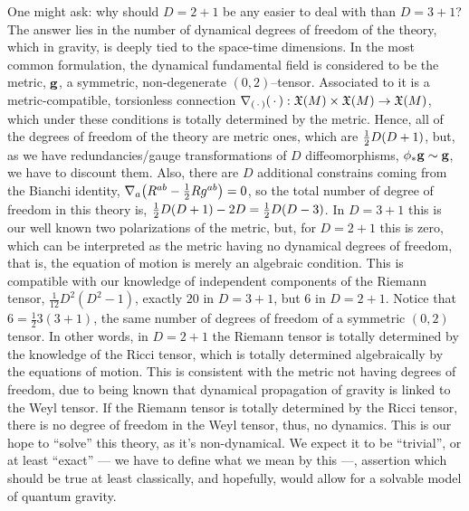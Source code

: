 One might ask: why should $D=2+1$ be any easier to deal with than $D=3+1$? The answer lies in the number of dynamical degrees of freedom of the theory, which in gravity, 
is deeply tied to the space-time dimensions. In the most common formulation, the dynamical fundamental field is considered to be the metric, $\vb g$, 
a symmetric, non-degenerate $(0,2)$--tensor. Associated to it is a metric-compatible, torsionless connection $\nabla_{\qty(\,\cdot\,)}\qty(\,\cdot\,):\mathfrak X\qty(M)\times \mathfrak X\qty(M)\rightarrow\mathfrak X(M)$, 
which under these conditions is totally determined by the metric. Hence, all of the degrees of freedom of the theory are metric ones, which are $\frac12D\qty(D+1)$, but, as we have redundancies/gauge 
transformations of $D$ diffeomorphisms, $\phi_\ast\vb g\sim\vb g$, we have to discount them. Also, there are $D$ additional constrains coming from the Bianchi identity, $\nabla_a\qty(R^{ab}-\frac12 Rg^{ab})=0$, 
so the total number of degree of freedom in this theory is, $\frac12D\qty(D+1)-2D=\frac12D\qty(D-3)$. 
In $D=3+1$ this is our well known two polarizations of the 
metric, but, for $D=2+1$ this is zero, which can be interpreted as the metric having no dynamical degrees of freedom, that is, the equation of motion 
is merely an algebraic condition. This is compatible with our knowledge of independent components of the Riemann tensor, $\frac{1}{12}D^2(D^2-1)$, exactly $20$ 
in $D=3+1$, but $6$ in $D=2+1$. Notice that $6=\frac123(3+1)$, the same number of degrees of freedom of a symmetric $(0,2)$ tensor. In other words, 
in $D=2+1$ the Riemann tensor is totally determined by the knowledge of the Ricci tensor, which is totally determined algebraically by the equations of motion. 
This is consistent with the metric not having degrees 
of freedom, due to being known that dynamical propagation of gravity is linked to the Weyl tensor. If the Riemann tensor is totally determined by the 
Ricci tensor, there is no degree of freedom in the Weyl tensor, thus, no dynamics.
This is our hope to ``solve'' this theory, as it's non-dynamical. We expect it to be ``trivial'', or at least ``exact'' --- we have to define what we mean by this ---, 
assertion which should be true at least classically, and hopefully, would allow for a solvable model of quantum gravity.